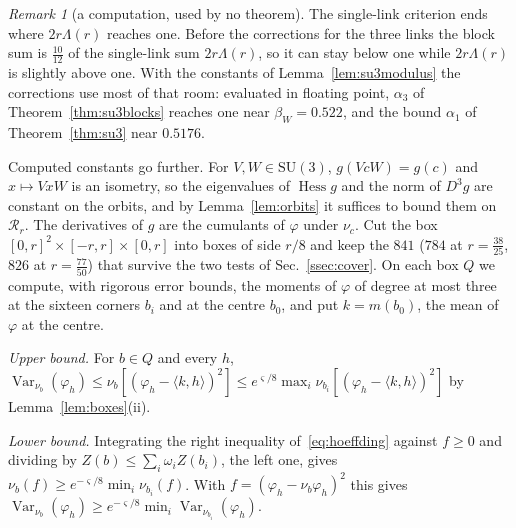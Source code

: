 \documentclass[aps,prd,twocolumn,superscriptaddress,nofootinbib,longbibliography,floatfix,amsmath,amssymb,10pt]{revtex4-2}
\theoremstyle{definition}
\theoremstyle{remark}
\newtheorem{remark}[theorem]{Remark}
\newcommand{\SU}{\mathrm{SU}}
\newcommand{\Hess}{\operatorname{Hess}}
\newcommand{\Var}{\operatorname{Var}}
\newcommand{\ip}[2]{\langle #1,#2\rangle}
\begin{document}
\begin{remark}[a computation, used by no theorem]\label{rem:su3blocks}
The single-link criterion ends where $2r\Lambda(r)$ reaches one. Before the
corrections for the three links the block sum is $\frac{10}{12}$ of the
single-link sum $2r\Lambda(r)$, so it can stay below one while $2r\Lambda(r)$
is slightly above one. With the constants of Lemma~\ref{lem:su3modulus} the
corrections use most of that room: evaluated in floating point, $\alpha_3$
of Theorem~\ref{thm:su3blocks} reaches one near $\beta_W=0.522$, and the
bound $\alpha_1$ of Theorem~\ref{thm:su3} near $0.5176$.

Computed constants go further. For $V,W\in\SU(3)$, $g(VcW)=g(c)$ and $x\mapsto VxW$ is an isometry, so the
eigenvalues of $\Hess g$ and the norm of $D^3g$ are constant on the orbits,
and by Lemma~\ref{lem:orbits} it suffices to bound them on $\mathcal R_r$. The
derivatives of $g$ are the cumulants of $\varphi$ under $\nu_c$. Cut the box
$[0,r]^2\times[-r,r]\times[0,r]$ into boxes of side $r/8$ and keep the $841$
($784$ at $r=\frac{38}{25}$, $826$ at $r=\frac{77}{50}$) that survive the two tests of Sec.~\ref{ssec:cover}. On each box $Q$ we
compute, with rigorous error bounds, the moments of $\varphi$ of degree at
most three at the sixteen corners $b_i$ and at the centre $b_0$, and put
$k=m(b_0)$, the mean of $\varphi$ at the centre.

\emph{Upper bound.} For $b\in Q$ and every $h$, $\Var_{\nu_b}(\varphi_h)\le
\nu_b[(\varphi_h-\ip kh)^2]\le e^{\varsigma/8}\max_i\nu_{b_i}[(\varphi_h-
\ip kh)^2]$ by Lemma~\ref{lem:boxes}(ii).

\emph{Lower bound.} Integrating the right inequality of~\eqref{eq:hoeffding}
against $f\ge0$ and dividing by $Z(b)\le\sum_i\omega_iZ(b_i)$, the left one,
gives $\nu_b(f)\ge
e^{-\varsigma/8}\min_i\nu_{b_i}(f)$. With $f=(\varphi_h-\nu_b\varphi_h)^2$ this
gives $\Var_{\nu_b}(\varphi_h)\ge e^{-\varsigma/8}\min_i\Var_{\nu_{b_i}}
(\varphi_h)$.


\end{remark}
\end{document}
